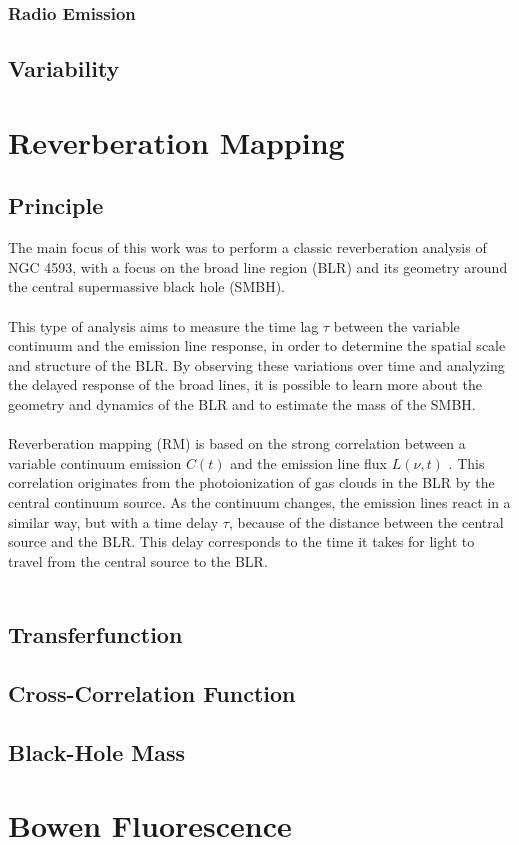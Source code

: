 \subsubsection{Radio Emission}




\subsection{Variability}

\section{Reverberation Mapping}


\subsection{Principle}


The main focus of this work was to perform a classic reverberation analysis of NGC 4593, with a focus on the broad line region (BLR) and its geometry around the central supermassive black hole (SMBH).\\\\
This type of analysis aims to measure the time lag $\tau$ between the variable continuum and the emission line response, in order to determine the spatial scale and structure of the BLR. By observing these variations over time and analyzing the delayed response of the broad lines, it is possible to learn more about the geometry and dynamics of the BLR and to estimate the mass of the SMBH.\\\\
Reverberation mapping (RM) is based on the strong correlation between a variable continuum emission $C(t)$ and the emission line flux $L(\nu, t)$ \parencite{horne2021space}. This correlation originates from the photoionization of gas clouds in the BLR by the central continuum source. As the continuum changes, the emission lines react in a similar way, but with a time delay $\tau$, because of the distance between the central source and the BLR. This delay corresponds to the time it takes for light to travel from the central source to the BLR.\\\\

\subsection{Transferfunction}

\subsection{Cross-Correlation Function}

\subsection{Black-Hole Mass}

\section{Bowen Fluorescence}